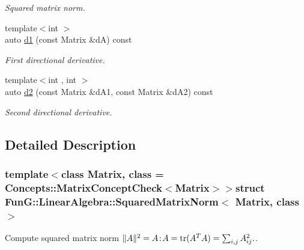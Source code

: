\begin{DoxyCompactItemize}
\begin{DoxyCompactList}\small\item\em Squared matrix norm. \end{DoxyCompactList}\item 
\hypertarget{structFunG_1_1LinearAlgebra_1_1SquaredMatrixNorm_acb0837c23a3c48e0d8c3f715a4b34692}{{\footnotesize template$<$int $>$ }\\auto \hyperlink{structFunG_1_1LinearAlgebra_1_1SquaredMatrixNorm_acb0837c23a3c48e0d8c3f715a4b34692}{d1} (const Matrix \&d\-A) const }\label{structFunG_1_1LinearAlgebra_1_1SquaredMatrixNorm_acb0837c23a3c48e0d8c3f715a4b34692}

\begin{DoxyCompactList}\small\item\em First directional derivative. \end{DoxyCompactList}\item 
\hypertarget{structFunG_1_1LinearAlgebra_1_1SquaredMatrixNorm_aa7b9cb341f1256714ab7ffc0e6e5fe7d}{{\footnotesize template$<$int , int $>$ }\\auto \hyperlink{structFunG_1_1LinearAlgebra_1_1SquaredMatrixNorm_aa7b9cb341f1256714ab7ffc0e6e5fe7d}{d2} (const Matrix \&d\-A1, const Matrix \&d\-A2) const }\label{structFunG_1_1LinearAlgebra_1_1SquaredMatrixNorm_aa7b9cb341f1256714ab7ffc0e6e5fe7d}

\begin{DoxyCompactList}\small\item\em Second directional derivative. \end{DoxyCompactList}\end{DoxyCompactItemize}


\subsection{Detailed Description}
\subsubsection*{template$<$class Matrix, class = Concepts\-::\-Matrix\-Concept\-Check$<$\-Matrix$>$$>$struct Fun\-G\-::\-Linear\-Algebra\-::\-Squared\-Matrix\-Norm$<$ Matrix, class $>$}

Compute squared matrix norm $ \|A\|^2 = A\negthinspace : \negthinspace A = \mathrm{tr}(A^TA) = \sum_{i,j} A_{ij}^2. $. 

